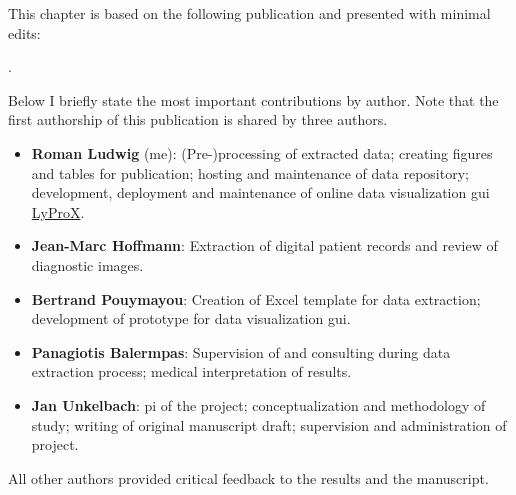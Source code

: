 \begin{tcolorbox}[
    title=\faIcon{users} Contributions,
    parbox=false,
    breakable,
    enhanced jigsaw
]
    This chapter is based on the following publication and presented with minimal edits:
    
    .
    
    Below I briefly state the most important contributions by author. Note that the first authorship of this publication is shared by three authors.

    \begin{itemize}[leftmargin=5.5mm]
        \item[\faIcon{user}] \textbf{Roman Ludwig} (me): (Pre-)processing of extracted data; creating figures and tables for publication; hosting and maintenance of data repository; development, deployment and maintenance of online data visualization \gls{gui} \href{https://lyprox.org}{ LyProX}.
        \item[\faIcon{user}] \textbf{Jean-Marc Hoffmann}: Extraction of digital patient records and review of diagnostic images.
        \item[\faIcon{user}] \textbf{Bertrand Pouymayou}: Creation of Excel template for data extraction; development of prototype for data visualization \gls{gui}.
        \item[\faIcon{user}] \textbf{Panagiotis Balermpas}: Supervision of and consulting during data extraction process; medical interpretation of results.
        \item[\faIcon{user}] \textbf{Jan Unkelbach}: \Gls{pi} of the project; conceptualization and methodology of study; writing of original manuscript draft; supervision and administration of project.
    \end{itemize}

    All other authors provided critical feedback to the results and the manuscript.
\end{tcolorbox}
